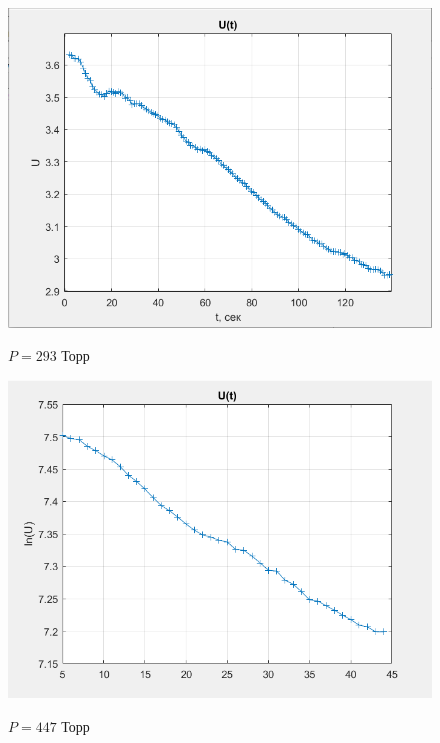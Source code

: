 \documentclass[a4paper, 12pt]{article} %
\begin{document}
\begin{figure}[h]
    \centering
    \includegraphics[width = 10.5 cm]{1gr293}
    \label{fig:vac}
    
    \begin{center}
		\caption{$P = 293$ Торр}
    \end{center}
\end{figure} 

\begin{figure}[h]
    \centering
    \includegraphics[width = 10.5 cm]{1gr447}
    \label{fig:vac}
    
    \begin{center}
		\caption{$P = 447$ Торр}
    \end{center}
\end{figure} 
\end{document}
